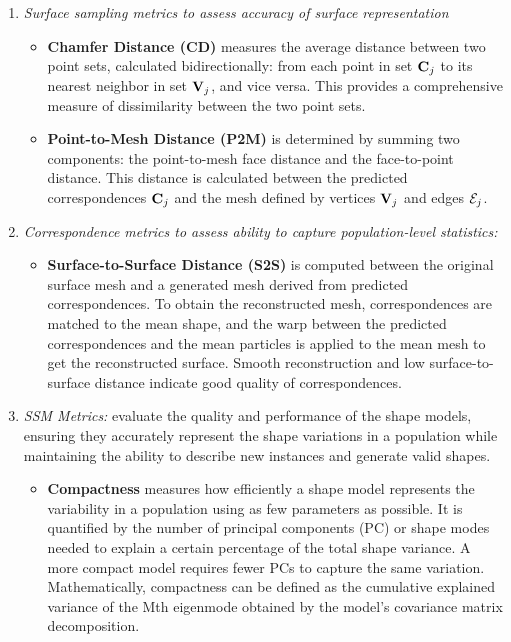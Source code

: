 \begin{enumerate}
    \item \textit{Surface sampling metrics to assess accuracy of surface representation}
    \begin{itemize}
        \item \textbf{Chamfer Distance (CD)} measures the average distance between two point sets, calculated bidirectionally: from each point in set \(\mathbf{C}_j\) to its nearest neighbor in set \(\mathbf{V}_j\), and vice versa. This provides a comprehensive measure of dissimilarity between the two point sets.
        \item \textbf{Point-to-Mesh Distance (P2M)} is determined by summing two components: the point-to-mesh face distance and the face-to-point distance. This distance is calculated between the predicted correspondences \(\mathbf{C}_j\) and the mesh defined by vertices \(\mathbf{V}_j\) and edges \(\mathcal{E}_j\).
    \end{itemize}
    \item \textit{Correspondence metrics to assess ability to capture population-level statistics:}
    \begin{itemize}
        \item \textbf{Surface-to-Surface Distance (S2S)} is computed between the original surface mesh and a generated mesh derived from predicted correspondences. To obtain the reconstructed mesh, correspondences are matched to the mean shape, and the warp between the predicted correspondences and the mean particles is applied to the mean mesh to get the reconstructed surface. Smooth reconstruction and low surface-to-surface distance indicate good quality of correspondences.
    \end{itemize}
    \item \textit{SSM Metrics:} evaluate the quality and performance of the shape models, ensuring they accurately represent the shape variations in a population while maintaining the ability to describe new instances and generate valid shapes.
    \begin{itemize}
    \item \textbf{Compactness} measures how efficiently a shape model represents the variability in a population using as few parameters as possible. It is quantified by the number of principal components (PC) or shape modes needed to explain a certain percentage of the total shape variance. A more compact model requires fewer PCs to capture the same variation. Mathematically, compactness can be defined as the cumulative explained variance of the Mth eigenmode obtained by the model's covariance matrix decomposition.


\end{itemize}
\end{enumerate}
